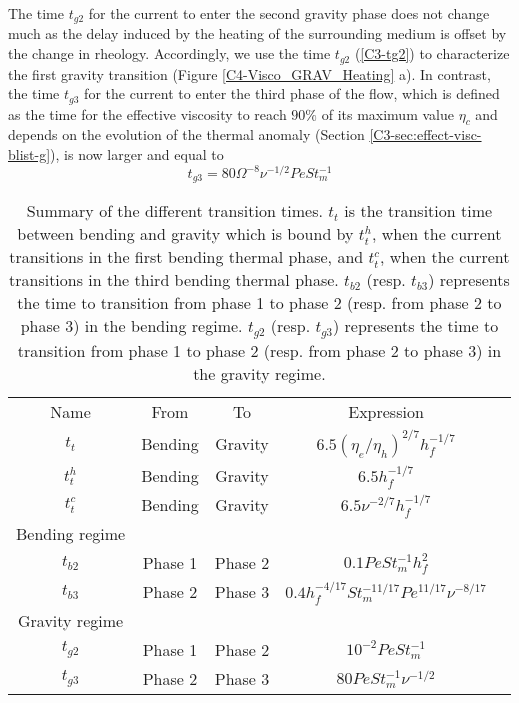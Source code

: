 The time  $t_{g2}$ for the current  to enter the second  gravity phase
does  not change  much as  the  delay induced  by the  heating of  the
surrounding medium is offset by  the change in rheology.  Accordingly,
we  use the  time $t_{g2}$  (\ref{C3-tg2}) to  characterize the  first
gravity   transition  (Figure   \ref{C4-Visco_GRAV_Heating}  a).    In
contrast, the time  $t_{g3}$ for the current to enter  the third phase
of the flow, which is defined  as the time for the effective viscosity
to  reach $90\%$  of its  maximum value  $\eta_c$ and  depends on  the
evolution       of       the      thermal       anomaly       (Section
\ref{C3-sec:effect-visc-blist-g}), is now larger and equal to
\begin{equation}
  t_{g3}= 80 \Omega^{-8}\nu^{-1/2}Pe St_m^{-1}
  \label{C4-tg3}
\end{equation}

\begin{table}[h!]
  \begin{center}
    \begin{tabular}{ccccc}
      Name&From&To&Expression\\
      $t_t$&Bending&Gravity&$6.5(\eta_e/\eta_h)^{2/7}h_f^{-1/7}$\\
      $t_t^h$&Bending&Gravity&$6.5h_f^{-1/7}$\\
      $t_t^c$&Bending&Gravity&$6.5\nu^{-2/7}h_f^{-1/7}$\\
      Bending regime&\multicolumn{3}{c}{} \\
      $t_{b2}$&Phase 1& Phase 2&$0.1 Pe St_m^{-1} h_f^2$\\
      $t_{b3}$&Phase 2& Phase 3 &$0.4 h_f^{-4/17} St_m^{-11/17}Pe^{11/17}\nu^{-8/17}$\\
      Gravity regime&\multicolumn{3}{c}{} \\
      $t_{g2}$ &Phase 1& Phase 2 &$10^{-2}PeSt_m^{-1}$\\
      $t_{g3}$ &Phase 2& Phase 3 &$ 80Pe St_m^{-1}\nu^{-1/2}$\\
    \end{tabular}
    \caption{Summary of the different  transition times.  $t_t$ is the
      transition time  between bending and  gravity which is  bound by
      $t_t^h$,  when  the current  transitions  in  the first  bending
      thermal phase, and $t_t^c$, when  the current transitions in the
      third  bending   thermal  phase.   $t_{b2}$   (resp.   $t_{b3}$)
      represents  the time  to  transition  from phase  1  to phase  2
      (resp. from phase 2 to phase  3) in the bending regime. $t_{g2}$
      (resp. $t_{g3}$) represents the time  to transition from phase 1
      to  phase 2  (resp. from  phase  2 to  phase 3)  in the  gravity
      regime. }
    \label{tab:TimeTransition}
  \end{center}
\end{table}
